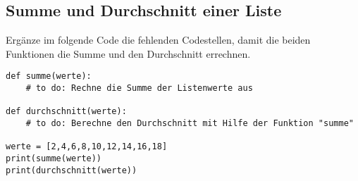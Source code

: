 \subsection{Summe und Durchschnitt einer Liste }
Ergänze im folgende Code die fehlenden Codestellen, damit die beiden Funktionen die Summe und den Durchschnitt errechnen.
\begin{lstlisting}
def summe(werte):
    # to do: Rechne die Summe der Listenwerte aus
	
def durchschnitt(werte):
    # to do: Berechne den Durchschnitt mit Hilfe der Funktion "summe"

werte = [2,4,6,8,10,12,14,16,18]
print(summe(werte))
print(durchschnitt(werte))
\end{lstlisting}
